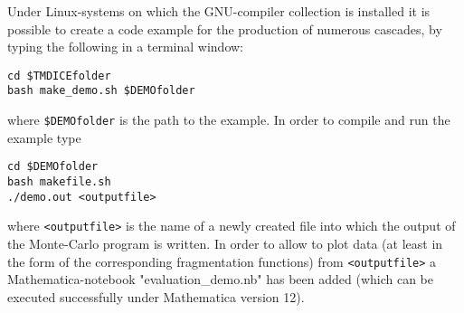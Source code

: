 \documentclass[preprint,12pt]{elsarticle}
\begin{document}
Under Linux-systems on which the GNU-compiler collection
is installed it is possible to create a code example for the production of numerous cascades, by typing the following in a terminal window:
\begin{verbatim}
cd $TMDICEfolder
bash make_demo.sh $DEMOfolder
\end{verbatim}
where \verb#$DEMOfolder# is the path to the example.
In order to compile and run the example type
\begin{verbatim}
cd $DEMOfolder
bash makefile.sh
./demo.out <outputfile>
\end{verbatim}
where \verb#<outputfile># is the name of a newly created file into which the output of the Monte-Carlo program is written.
In order to allow to plot data (at least in the form of the corresponding fragmentation functions) from \verb#<outputfile># a Mathematica-notebook "evaluation\_demo.nb" has been added (which can be executed successfully under Mathematica version 12).
\end{document}
